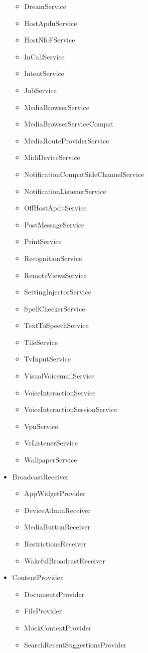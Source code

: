 \documentclass{article}
\begin{document}
\begin{itemize}
\begin{itemize}
			\item DreamService
			\item HostApduService
			\item HostNfcFService
			\item InCallService
			\item IntentService
			\item JobService
			\item MediaBrowserService
			\item MediaBrowserServiceCompat
			\item MediaRouteProviderService
			\item MidiDeviceService
			\item NotificationCompatSideChannelService
			\item NotificationListenerService
			\item OffHostApduService
			\item PostMessageService
			\item PrintService
			\item RecognitionService
			\item RemoteViewsService
			\item SettingInjectorService
			\item SpellCheckerService
			\item TextToSpeechService
			\item TileService
			\item TvInputService
			\item VisualVoicemailService
			\item VoiceInteractionService
			\item VoiceInteractionSessionService
			\item VpnService
			\item VrListenerService
			\item WallpaperService
		\end{itemize}
	\item BroadcastReceiver
		\begin{itemize}
			\item AppWidgetProvider
			\item DeviceAdminReceiver
			\item MediaButtonReceiver
			\item RestrictionsReceiver
			\item WakefulBroadcastReceiver
		\end{itemize}
	\item ContentProvider
		\begin{itemize}
			\item DocumentsProvider
			\item FileProvider
			\item MockContentProvider
			\item SearchRecentSuggestionsProvider
		\end{itemize}
\end{itemize}
\end{document}
